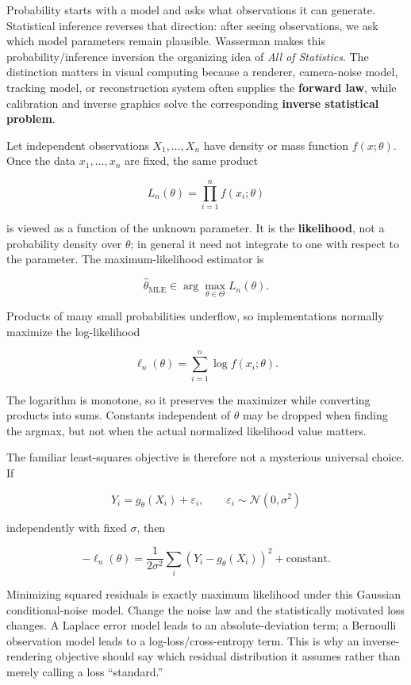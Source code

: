 Probability starts with a model and asks what observations it can generate. Statistical inference reverses that direction: after seeing observations, we ask which model parameters remain plausible. Wasserman makes this probability/inference inversion the organizing idea of \emph{All of Statistics}. The distinction matters in visual computing because a renderer, camera-noise model, tracking model, or reconstruction system often supplies the \textbf{forward law}, while calibration and inverse graphics solve the corresponding \textbf{inverse statistical problem}.

Let independent observations \(X_1,\ldots,X_n\) have density or mass function \(f(x;\theta)\). Once the data \(x_1,\ldots,x_n\) are fixed, the same product

\[
L_n(\theta)=\prod_{i=1}^{n} f(x_i;\theta)
\]

is viewed as a function of the unknown parameter. It is the \textbf{likelihood}, not a probability density over \(\theta\); in general it need not integrate to one with respect to the parameter. The maximum-likelihood estimator is

\[
\hat\theta_{\mathrm{MLE}}\in\arg\max_{\theta\in\Theta}L_n(\theta).
\]

Products of many small probabilities underflow, so implementations normally maximize the log-likelihood

\[
\ell_n(\theta)=\sum_{i=1}^{n}\log f(x_i;\theta).
\]

The logarithm is monotone, so it preserves the maximizer while converting products into sums. Constants independent of \(\theta\) may be dropped when finding the argmax, but not when the actual normalized likelihood value matters.

The familiar least-squares objective is therefore not a mysterious universal choice. If

\[
Y_i=g_\theta(X_i)+\varepsilon_i,\qquad
\varepsilon_i\sim\mathcal N(0,\sigma^2)
\]

independently with fixed \(\sigma\), then

\[
-\ell_n(\theta)
=
\frac{1}{2\sigma^2}\sum_i
\left(Y_i-g_\theta(X_i)\right)^2
+\text{constant}.
\]

Minimizing squared residuals is exactly maximum likelihood under this Gaussian conditional-noise model. Change the noise law and the statistically motivated loss changes. A Laplace error model leads to an absolute-deviation term; a Bernoulli observation model leads to a log-loss/cross-entropy term. This is why an inverse-rendering objective should say which residual distribution it assumes rather than merely calling a loss ``standard.''


